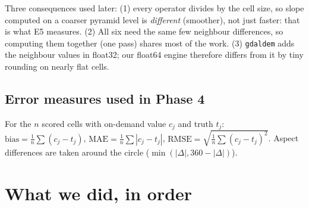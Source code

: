 ﻿\documentclass[11pt,a4paper]{article}
\newcommand{\code}[1]{\texttt{#1}}
\begin{document}
Three consequences used later: (1) every operator divides by the cell size, so slope computed on a coarser pyramid
level is \emph{different} (smoother), not just faster: that is what E5 measures. (2) All six need the same few
neighbour differences, so computing them together (one pass) shares most of the work. (3) \code{gdaldem} adds the
neighbour values in float32; our float64 engine therefore differs from it by tiny rounding on nearly flat cells.

\subsection{Error measures used in Phase 4}
For the $n$ scored cells with on-demand value $c_j$ and truth $t_j$:
$\text{bias} = \frac1n\sum (c_j - t_j)$, $\text{MAE} = \frac1n\sum |c_j - t_j|$,
$\text{RMSE} = \sqrt{\frac1n\sum (c_j - t_j)^2}$. Aspect differences are taken around the circle
($\min(|\Delta|, 360-|\Delta|)$).

\section{What we did, in order}
\end{document}
